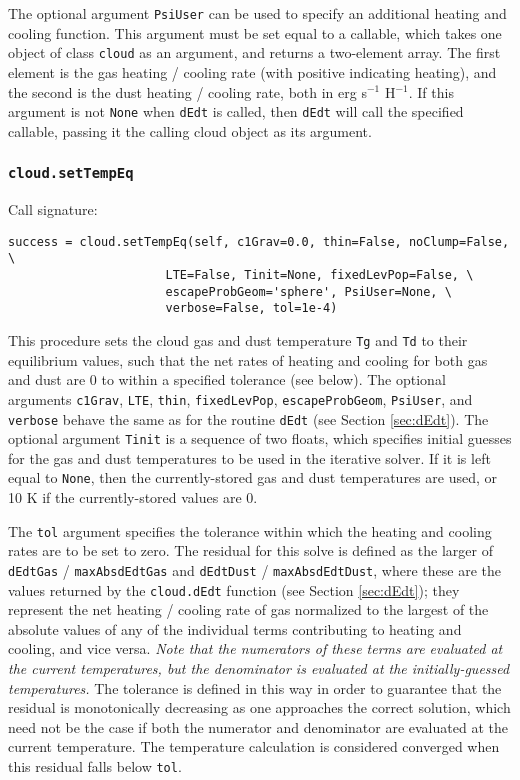 \documentclass[12pt]{article}
\begin{document}
The optional argument \verb=PsiUser= can be used to specify an additional heating and cooling function. This argument must be set equal to a callable, which takes one object of class \verb=cloud= as an argument, and returns a two-element array. The first element is the gas heating / cooling rate (with positive indicating heating), and the second is the dust heating / cooling rate, both in erg s$^{-1}$ H$^{-1}$. If this argument is not \verb=None= when \verb=dEdt= is called, then \verb=dEdt= will call the specified callable, passing it the calling cloud object as its argument.

\subsubsection{\texttt{cloud.setTempEq}}
\label{sec:settempeq}

Call signature:

\begin{verbatim}
success = cloud.setTempEq(self, c1Grav=0.0, thin=False, noClump=False, \
                      LTE=False, Tinit=None, fixedLevPop=False, \
                      escapeProbGeom='sphere', PsiUser=None, \
                      verbose=False, tol=1e-4)
\end{verbatim}

This procedure sets the cloud gas and dust temperature \verb=Tg= and \verb=Td= to their equilibrium values, such that the net rates of heating and cooling for both gas and dust are 0 to within a specified tolerance (see below). The optional arguments \verb=c1Grav=, \verb=LTE=, \verb=thin=, \verb=fixedLevPop=, \verb=escapeProbGeom=, \verb=PsiUser=, and \verb=verbose= behave the same as for the routine \verb=dEdt= (see Section \ref{sec:dEdt}). The optional argument \verb=Tinit= is a sequence of two floats, which specifies initial guesses for the gas and dust temperatures to be used in the iterative solver. If it is left equal to \verb=None=, then the currently-stored gas and dust temperatures are used, or 10 K if the currently-stored values are 0.

The \verb=tol= argument specifies the tolerance within which the heating and cooling rates are to be set to zero. The residual for this solve is defined as the larger of \verb=dEdtGas= / \verb=maxAbsdEdtGas= and \verb=dEdtDust= / \verb=maxAbsdEdtDust=, where these are the values returned by the \verb=cloud.dEdt= function (see Section \ref{sec:dEdt}); they represent the net heating / cooling rate of gas normalized to the largest of the absolute values of any of the individual terms contributing to heating and cooling, and vice versa. \textit{Note that the numerators of these terms are evaluated at the current temperatures, but the denominator is evaluated at the initially-guessed temperatures.} The tolerance is defined in this way in order to guarantee that the residual is monotonically decreasing as one approaches the correct solution, which need not be the case if both the numerator and denominator are evaluated at the current temperature. The temperature calculation is considered converged when this residual falls below \verb=tol=.
\end{document}
